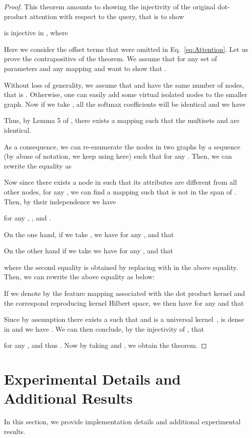 \begin{proof}
    This theorem amounts to showing the injectivity of the original dot-product attention with respect to the query, that is to show
    
    is injective in , where
    
    Here we consider the offset terms that were omitted in Eq.~\eqref{eq:Attention}.
    Let us prove the contrapositive of the theorem. We assume that  for any set of parameters and any mapping  and want to show that . 
    
    Without loss of generality, we assume that  and  have the same number of nodes, that is . Otherwise, one can easily add some virtual isolated nodes to the smaller graph. Now if we take , all the softmax coefficients will be identical and we have
    
    Thus, by Lemma 5 of \citet{xu2018how}, there exists a mapping  such that the multisets  and  are identical. 
    
    As a consequence, we can re-enumerate the nodes in two graphs by a sequence  (by abuse of notation, we keep using  here) such that  for any . Then, we can rewrite the equality  as
    
    Now since there exists a node  in  such that its attributes are different from all other nodes, \ie  for any , we can find a mapping  such that  is not in the span of . Then, by their independence we have
    
    for any , ,  and .
    
    On the one hand, if we take , we have for any ,  and  that
    
    On the other hand if we take  we have for any ,  and  that
    
    where the second equality is obtained by replacing  with  in the above equality. Then, we can rewrite the above equality as below:
    
    If we denote by  the feature mapping associated with the dot product kernel  and  the correspond reproducing kernel Hilbert space, we then have for any  and  that
    
    Since by assumption there exists a  such that  and  is a universal kernel~\citep{micchelli2006universal},  is dense in  and we have . We can then conclude, by the injectivity of , that
    
    for any , and thus . Now by taking  and , we obtain the theorem.
\end{proof}


\section{Experimental Details and Additional Results}\label{sec:supp_experiments}
In this section, we provide implementation details and additional experimental results.  

